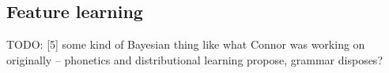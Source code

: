 \documentclass[11pt, oneside]{article}   	%
\begin{document}
\subsection{Feature learning}

TODO: [5] some kind of Bayesian thing like what Connor was working on originally -- phonetics and distributional learning propose, grammar disposes?




\end{document}
